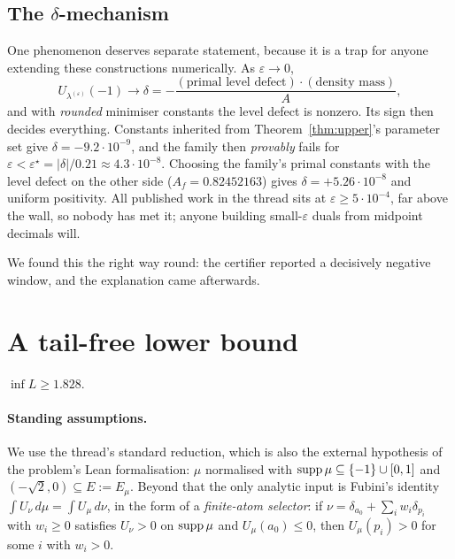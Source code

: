 \documentclass[11pt]{article}
\begin{document}
\subsection{The $\delta$-mechanism}

One phenomenon deserves separate statement, because it is a trap for
anyone extending these constructions numerically. As
$\varepsilon\to0$,
\[
  U_{\lambda^{(\varepsilon)}}(-1)\longrightarrow
  \delta = -\frac{(\text{primal level defect})\cdot(\text{density mass})}{A},
\]
and with \emph{rounded} minimiser constants the level defect is nonzero.
Its sign then decides everything. Constants inherited from
Theorem~\ref{thm:upper}'s parameter set give $\delta=-9.2\cdot10^{-9}$,
and the family then \emph{provably} fails for
$\varepsilon<\varepsilon^\star=\lvert\delta\rvert/0.21\approx
4.3\cdot10^{-8}$. Choosing the family's primal constants with the level
defect on the other side ($A_f=0.82452163$) gives
$\delta=+5.26\cdot10^{-8}$ and uniform positivity. All published work in
the thread sits at $\varepsilon\ge5\cdot10^{-4}$, far above the wall,
so nobody has met it; anyone building small-$\varepsilon$ duals from
midpoint decimals will.

We found this the right way round: the certifier reported a decisively
negative window, and the explanation came afterwards.

\section{A tail-free lower bound}\label{sec:lower}

\begin{theorem}\label{thm:lower}
$\inf L \ge 1.828$.
\end{theorem}

\paragraph{Standing assumptions.} We use the thread's standard
reduction, which is also the external hypothesis of the problem's Lean
formalisation: $\mu$ normalised with $\operatorname{supp}\mu\subseteq\{-1\}\cup[0,1]$
and $(-\sqrt2,0)\subseteq E:=E_\mu$. Beyond that the only analytic input
is Fubini's identity $\int U_\nu\,d\mu=\int U_\mu\,d\nu$, in the form of
a \emph{finite-atom selector}: if $\nu=\delta_{a_0}+\sum_i w_i
\delta_{p_i}$ with $w_i\ge0$ satisfies $U_\nu>0$ on $\operatorname{supp}\mu$ and
$U_\mu(a_0)\le0$, then $U_\mu(p_i)>0$ for some $i$ with $w_i>0$.
\end{document}
